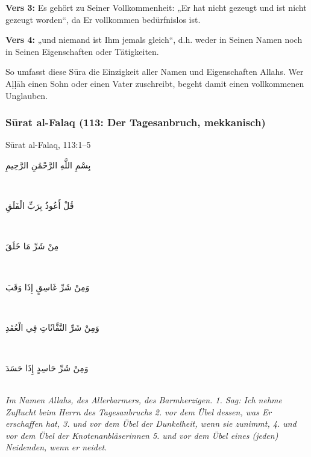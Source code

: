 \textbf{Vers 3:} Es gehört zu Seiner Vollkommenheit: „Er hat nicht gezeugt und ist nicht gezeugt
worden“, da Er vollkommen bedürfnislos ist.

\textbf{Vers 4:} „und niemand ist Ihm jemals gleich“, d.h. weder in Seinen Namen noch in Seinen
Eigenschaften oder Tätigkeiten.

\begin{merke}
So umfasst diese Sūra die Einzigkeit aller Namen und Eigenschaften Allahs. Wer Aḷḷāh einen
Sohn oder einen Vater zuschreibt, begeht damit einen vollkommenen Unglauben.
\end{merke}

\subsubsection*{Sūrat al-Falaq (113: Der Tagesanbruch, mekkanisch)}

\begin{quranvers}{Sūrat al-Falaq, 113:1--5}
{\quranfont\begin{Arabic}
بِسْمِ اللَّهِ الرَّحْمَٰنِ الرَّحِيمِ
\end{Arabic}}\\[2mm]
{\quranfont\begin{Arabic}
قُلْ أَعُوذُ بِرَبِّ الْفَلَقِ
\end{Arabic}}\\[2mm]
{\quranfont\begin{Arabic}
مِنْ شَرِّ مَا خَلَقَ
\end{Arabic}}\\[2mm]
{\quranfont\begin{Arabic}
وَمِنْ شَرِّ غَاسِقٍ إِذَا وَقَبَ
\end{Arabic}}\\[2mm]
{\quranfont\begin{Arabic}
وَمِنْ شَرِّ النَّفَّاثَاتِ فِي الْعُقَدِ
\end{Arabic}}\\[2mm]
{\quranfont\begin{Arabic}
وَمِنْ شَرِّ حَاسِدٍ إِذَا حَسَدَ
\end{Arabic}}\\[3mm]
\emph{Im Namen Allahs, des Allerbarmers, des Barmherzigen. 1. Sag: Ich nehme Zuflucht beim
Herrn des Tagesanbruchs 2. vor dem Übel dessen, was Er erschaffen hat, 3. und vor dem Übel
der Dunkelheit, wenn sie zunimmt, 4. und vor dem Übel der Knotenanbläserinnen 5. und vor dem
Übel eines (jeden) Neidenden, wenn er neidet.}
\end{quranvers}

